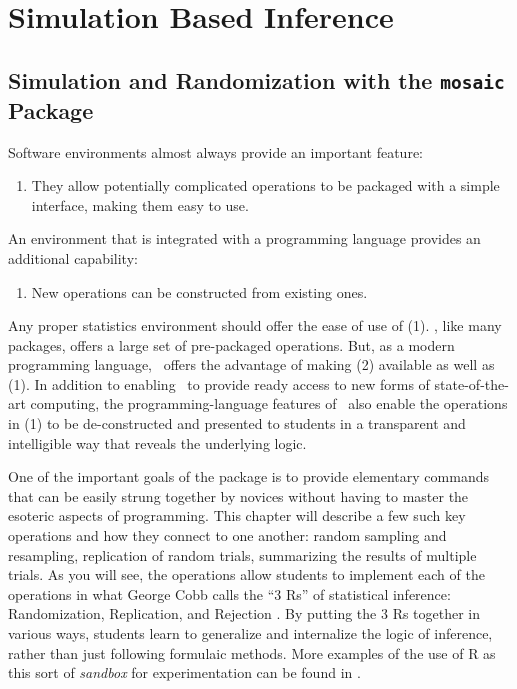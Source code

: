 

\chapter{Simulation Based Inference}







\section{Simulation and Randomization with the  \texttt{mosaic} Package}

Software environments almost always provide an important feature:
\begin{enumerate}
  \item They allow potentially complicated operations to be
    packaged with a simple interface, making them easy to use.
	\saveenumi
\end{enumerate}
An environment that is integrated with a programming language provides
an additional capability:
\begin{enumerate}
\reuseenumi
  \item New operations can be constructed from existing ones.
\end{enumerate}

Any proper statistics environment should offer the ease of use of
(1).  \R, like many packages, offers a large set of pre-packaged
operations.  But, as a modern programming language, \R\ offers the
advantage of making (2) available as well as (1).  In addition to
enabling \R\ to provide ready access to new forms of state-of-the-art
computing, the programming-language features of \R\ also enable the
operations in (1) to be de-constructed and presented to students in a
transparent and intelligible way that reveals the underlying logic.

One of the important goals of the  package is to provide
elementary commands that can be easily strung together by novices
without having to master the esoteric aspects of programming.  
%
This
chapter will describe a few such key operations and how they connect
to one another: random sampling and resampling, replication of random
trials, summarizing the results of multiple trials.  As you will see,
the  operations allow students to implement each of the
operations in what George Cobb calls the ``3 Rs'' of statistical
inference: Randomization, Replication, and Rejection \cite{USCOTS-cobb-2005}.
By putting the 3 Rs together in various ways, students learn to
generalize and internalize the logic of inference, rather than just
following formulaic methods.  
More examples of the use of R as this sort
of \emph{sandbox} for experimentation can be found in \cite{hort:brow:2004}.

